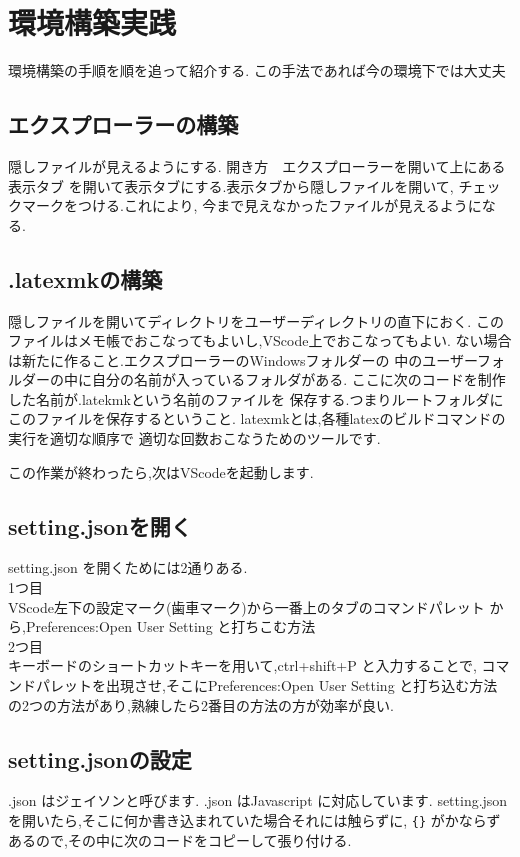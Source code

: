 \documentclass{ltjsarticle}
\begin{document}
\section{環境構築実践}
環境構築の手順を順を追って紹介する.
この手法であれば今の環境下では大丈夫
\subsection{エクスプローラーの構築}
隠しファイルが見えるようにする.
開き方　エクスプローラーを開いて上にある表示タブ
を開いて表示タブにする.表示タブから隠しファイルを開いて,
チェックマークをつける.これにより,
今まで見えなかったファイルが見えるようになる.

\subsection{.latexmkの構築} %

\label{sub:.latexmkの構築}
隠しファイルを開いてディレクトリをユーザーディレクトリの直下におく.
このファイルはメモ帳でおこなってもよいし,VScode上でおこなってもよい.
ない場合は新たに作ること.エクスプローラーのWindowsフォルダーの
中のユーザーフォルダーの中に自分の名前が入っているフォルダがある.
ここに次のコードを制作した名前が.latekmkという名前のファイルを
保存する.つまりルートフォルダにこのファイルを保存するということ.
latexmkとは,各種latexのビルドコマンドの実行を適切な順序で
適切な回数おこなうためのツールです.


この作業が終わったら,次はVScodeを起動します.
\subsection{setting.jsonを開く}
setting.json を開くためには2通りある.\\
1つ目\\
VScode左下の設定マーク(歯車マーク)から一番上のタブのコマンドパレット
から,Preferences:Open User Setting と打ちこむ方法\\
2つ目\\
キーボードのショートカットキーを用いて,ctrl+shift+P と入力することで,
コマンドパレットを出現させ,そこにPreferences:Open User Setting
と打ち込む方法\\
の2つの方法があり,熟練したら2番目の方法の方が効率が良い.
\subsection{setting.jsonの設定}
.json はジェイソンと呼びます.
.json はJavascript に対応しています.
setting.json を開いたら,そこに何か書き込まれていた場合それには触らずに,
\verb|{}|
がかならずあるので,その中に次のコードをコピーして張り付ける.
\end{document}
